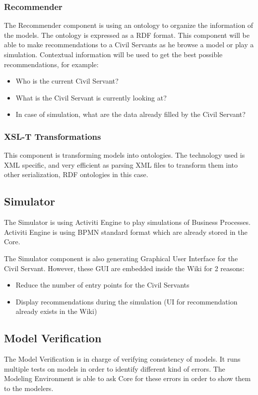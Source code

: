 \documentclass{learnpad}
\begin{document}
\subsubsection{Recommender}
The Recommender component is using an ontology to organize the information of
the models.  The ontology is expressed as a RDF format.  This component will be
able to make recommendations to a Civil Servants as he browse a model or play a
simulation.  Contextual information will be used to get the best possible
recommendations, for example:
\begin{itemize}
	\item Who is the current Civil Servant?
	\item What is the Civil Servant is currently looking at?
	\item In case of simulation, what are the data already filled by the Civil
		Servant?
\end{itemize}

\subsubsection{XSL-T Transformations}
This component is transforming models into ontologies.  The technology used is
XML specific, and very efficient as parsing XML files to transform them into
other serialization, RDF ontologies in this case.

\subsection{Simulator}
The Simulator is using Activiti Engine to play simulations of Business
Processes.  Activiti Engine is using BPMN standard format which are already
stored in the \learnpad Core.

The Simulator component is also generating Graphical User Interface for the
Civil Servant.  However, these GUI are embedded inside the Wiki for 2 reasons:
\begin{itemize}
	\item Reduce the number of entry points for the Civil Servants
	\item Display recommendations during the simulation (UI for recommendation
		already exists in the Wiki)
\end{itemize}

\subsection{Model Verification}
The Model Verification is in charge of verifying consistency of models.  It 
runs multiple tests on models in order to identify different kind of errors.  The
Modeling Environment is able to ask \learnpad Core for these errors in order to
show them to the modelers.
\end{document}
